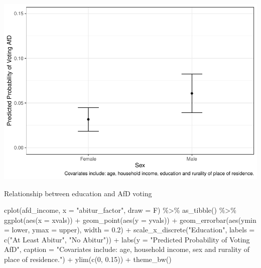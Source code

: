 \documentclass[
]{article}
\newenvironment{Shaded}{\begin{snugshade}}{\end{snugshade}}
\newcommand{\AttributeTok}[1]{\textcolor[rgb]{0.77,0.63,0.00}{#1}}
\newcommand{\DecValTok}[1]{\textcolor[rgb]{0.00,0.00,0.81}{#1}}
\newcommand{\FloatTok}[1]{\textcolor[rgb]{0.00,0.00,0.81}{#1}}
\newcommand{\FunctionTok}[1]{\textcolor[rgb]{0.00,0.00,0.00}{#1}}
\newcommand{\NormalTok}[1]{#1}
\newcommand{\SpecialCharTok}[1]{\textcolor[rgb]{0.00,0.00,0.00}{#1}}
\newcommand{\StringTok}[1]{\textcolor[rgb]{0.31,0.60,0.02}{#1}}
\begin{document}
\includegraphics{AVCD_Final_Assignment-Edenhofer_latest_files/figure-latex/afd-sex-1.pdf}

Relationship between education and AfD voting

\begin{Shaded}
\begin{Highlighting}[]
\FunctionTok{cplot}\NormalTok{(afd\_income, }\AttributeTok{x =} \StringTok{"abitur\_factor"}\NormalTok{, }\AttributeTok{draw =}\NormalTok{ F) }\SpecialCharTok{\%\textgreater{}\%}
  \FunctionTok{as\_tibble}\NormalTok{() }\SpecialCharTok{\%\textgreater{}\%}
  \FunctionTok{ggplot}\NormalTok{(}\FunctionTok{aes}\NormalTok{(}\AttributeTok{x =}\NormalTok{ xvals)) }\SpecialCharTok{+}
  \FunctionTok{geom\_point}\NormalTok{(}\FunctionTok{aes}\NormalTok{(}\AttributeTok{y =}\NormalTok{ yvals)) }\SpecialCharTok{+}
  \FunctionTok{geom\_errorbar}\NormalTok{(}\FunctionTok{aes}\NormalTok{(}\AttributeTok{ymin =}\NormalTok{ lower, }\AttributeTok{ymax =}\NormalTok{ upper), }\AttributeTok{width =} \FloatTok{0.2}\NormalTok{) }\SpecialCharTok{+}
  \FunctionTok{scale\_x\_discrete}\NormalTok{(}\StringTok{"Education"}\NormalTok{, }\AttributeTok{labels =} \FunctionTok{c}\NormalTok{(}\StringTok{"At Least Abitur"}\NormalTok{, }
                                           \StringTok{"No Abitur"}\NormalTok{)) }\SpecialCharTok{+}
  \FunctionTok{labs}\NormalTok{(}\AttributeTok{y =} \StringTok{"Predicted Probability of Voting AfD"}\NormalTok{, }
       \AttributeTok{caption =} \StringTok{"Covariates include: age, household income, sex and rurality of place of residence."}\NormalTok{) }\SpecialCharTok{+}
  \FunctionTok{ylim}\NormalTok{(}\FunctionTok{c}\NormalTok{(}\DecValTok{0}\NormalTok{, }\FloatTok{0.15}\NormalTok{)) }\SpecialCharTok{+}
  \FunctionTok{theme\_bw}\NormalTok{()}
\end{Highlighting}
\end{Shaded}
\end{document}
